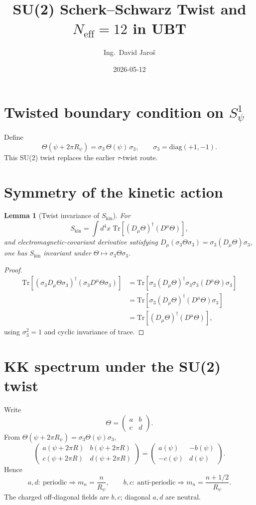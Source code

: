 \documentclass[12pt,a4paper]{article}
\title{SU(2) Scherk--Schwarz Twist and \(N_{\mathrm{eff}}=12\) in UBT}
\author{Ing.\ David Jaroš}
\date{2026-05-12}
\newtheorem{lemma}{Lemma}[section]
\begin{document}
\maketitle

\section{Twisted boundary condition on \(S^1_\psi\)}
Define
\[
\Theta(\psi+2\pi R_\psi)=\sigma_3\,\Theta(\psi)\,\sigma_3,
\qquad
\sigma_3=\mathrm{diag}(+1,-1).
\]
This SU(2) twist replaces the earlier \(\tau\)-twist route.

\section{Symmetry of the kinetic action}
\begin{lemma}[Twist invariance of \(S_{\mathrm{kin}}\)]
For
\[
S_{\mathrm{kin}}=\int d^4x\;\mathrm{Tr}\!\left[(D_\mu\Theta)^\dagger(D^\mu\Theta)\right],
\]
and electromagnetic-covariant derivative satisfying
\(D_\mu(\sigma_3\Theta\sigma_3)=\sigma_3(D_\mu\Theta)\sigma_3\),
one has \(S_{\mathrm{kin}}\) invariant under
\(\Theta\mapsto\sigma_3\Theta\sigma_3\).
\end{lemma}

\begin{proof}
\[
\begin{aligned}
\mathrm{Tr}\!\left[(\sigma_3 D_\mu\Theta\sigma_3)^\dagger(\sigma_3 D^\mu\Theta\sigma_3)\right]
&=\mathrm{Tr}\!\left[\sigma_3(D_\mu\Theta)^\dagger\sigma_3\sigma_3(D^\mu\Theta)\sigma_3\right]\\
&=\mathrm{Tr}\!\left[\sigma_3(D_\mu\Theta)^\dagger(D^\mu\Theta)\sigma_3\right]\\
&=\mathrm{Tr}\!\left[(D_\mu\Theta)^\dagger(D^\mu\Theta)\right],
\end{aligned}
\]
using \(\sigma_3^2=1\) and cyclic invariance of trace.
\end{proof}

\section{KK spectrum under the SU(2) twist}
Write
\[
\Theta=\begin{pmatrix}a & b\\ c & d\end{pmatrix}.
\]
From
\(\Theta(\psi+2\pi R_\psi)=\sigma_3\Theta(\psi)\sigma_3\),
\[
\begin{pmatrix}
a(\psi+2\pi R) & b(\psi+2\pi R)\\
c(\psi+2\pi R) & d(\psi+2\pi R)
\end{pmatrix}
=
\begin{pmatrix}
a(\psi) & -b(\psi)\\
-c(\psi) & d(\psi)
\end{pmatrix}.
\]
Hence
\[
a,d:\ \text{periodic}\Rightarrow m_n=\frac{n}{R_\psi},
\qquad
b,c:\ \text{anti-periodic}\Rightarrow m_n=\frac{n+1/2}{R_\psi}.
\]
The charged off-diagonal fields are \(b,c\); diagonal \(a,d\) are neutral.
\end{document}
